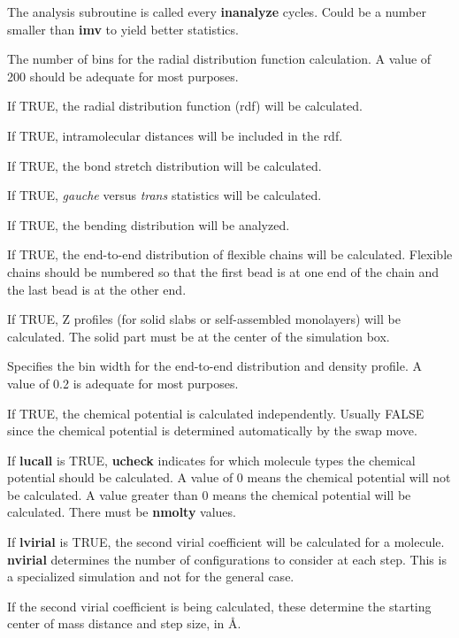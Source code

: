 \documentclass[12pt,letterpaper]{article}
\begin{document}
 The analysis subroutine is called
every {\bf inanalyze} cycles. Could be a number smaller than
{\bf imv} to yield better statistics.

 The number of bins for the radial
distribution function calculation. A value of 200 should be
adequate for most purposes.

 If TRUE, the radial distribution function (rdf) will be calculated.

 If TRUE, intramolecular distances will be included in the rdf.

 If TRUE, the bond stretch distribution will be calculated.

 If TRUE, \textit{gauche} versus
\textit{trans} statistics will be calculated.

 If TRUE, the bending distribution will be analyzed.

 If TRUE, the end-to-end distribution of
flexible chains will be calculated. Flexible chains should
be numbered so that the first bead is at one end of the
chain and the last bead is at the other end.

 If TRUE, Z profiles (for solid slabs
or self-assembled monolayers) will be calculated. The solid
part must be at the center of the simulation box.

 Specifies the bin width for the
end-to-end distribution and density profile. A value of 0.2
is adequate for most purposes.

 If TRUE, the chemical potential is
calculated independently. Usually FALSE since the chemical
potential is determined automatically by the swap move.

 If {\bf lucall} is TRUE, {\bf ucheck}
indicates for which molecule types the chemical potential
should be calculated. A value of 0 means the chemical
potential will not be calculated. A value greater than 0
means the chemical potential will be calculated. There must
be {\bf nmolty} values.

 If {\bf lvirial} is TRUE, the second
virial coefficient will be calculated for a molecule. {\bf
  nvirial} determines the number of configurations to
consider at each step. This is a specialized simulation and
not for the general case.

 If the second virial
coefficient is being calculated, these determine the
starting center of mass distance and step size, in {\AA}.
\end{document}
